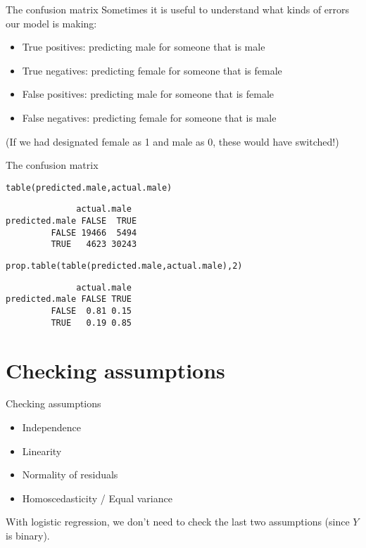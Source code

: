 \documentclass{beamer}\usepackage[]{graphicx}\usepackage[]{color}
\makeatletter
\newcommand{\hlnum}[1]{\textcolor[rgb]{0.824,0.412,0.118}{#1}}%
\newcommand{\hlstd}[1]{\textcolor[rgb]{1,0.894,0.769}{#1}}%
\newcommand{\hlkwd}[1]{\textcolor[rgb]{1,0.78,0.769}{#1}}%
\newenvironment{kframe}{%
 \def\at@end@of@kframe{}%
 \ifinner\ifhmode%
  \def\at@end@of@kframe{\end{minipage}}%
  \begin{minipage}{\columnwidth}%
 \fi\fi%
 \def\FrameCommand##1{\hskip\@totalleftmargin \hskip-\fboxsep
 \colorbox{shadecolor}{##1}\hskip-\fboxsep
     \hskip-\linewidth \hskip-\@totalleftmargin \hskip\columnwidth}%
 \MakeFramed {\advance\hsize-\width
   \@totalleftmargin\z@ \linewidth\hsize
   \@setminipage}}%
 {\par\unskip\endMakeFramed%
 \at@end@of@kframe}
\newenvironment{knitrout}{}{} %
\makeatother
\begin{document}
\begin{darkframes}
    \begin{frame}{The confusion matrix}
      Sometimes it is useful to understand what kinds of errors our model is making:
      \begin{itemize}
        \item \alert{True positives}: predicting male for someone that is male
        \item \alert{True negatives}: predicting female for someone that is female
        \item \alert{False positives}: predicting male for someone that is female
        \item \alert{False negatives}: predicting female for someone that is male
      \end{itemize}
      (If we had designated female as 1 and male as 0, these would have switched!)
    \end{frame}

    \begin{frame}[fragile]{The confusion matrix}
\begin{knitrout}
\begin{kframe}
\begin{alltt}
\hlkwd{table}\hlstd{(predicted.male, actual.male)}
\end{alltt}
\begin{verbatim}
              actual.male
predicted.male FALSE  TRUE
         FALSE 19466  5494
         TRUE   4623 30243
\end{verbatim}
\begin{alltt}
\hlkwd{prop.table}\hlstd{(}\hlkwd{table}\hlstd{(predicted.male, actual.male),} \hlnum{2}\hlstd{)}
\end{alltt}
\begin{verbatim}
              actual.male
predicted.male FALSE TRUE
         FALSE  0.81 0.15
         TRUE   0.19 0.85
\end{verbatim}
\end{kframe}
\end{knitrout}
    \end{frame}

    \section{Checking assumptions}

    \begin{frame}{Checking assumptions}
      \begin{itemize}
        \item Independence
        \item Linearity
        \item Normality of residuals \redx
        \item Homoscedasticity / Equal variance \redx
      \end{itemize}
      With logistic regression, we don't need to check the last two assumptions (since $Y$ is binary).
    \end{frame}


\end{darkframes}
\end{document}
